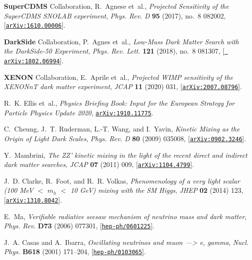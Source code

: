 \documentclass[prd,nofootinbib,preprint,superscriptaddress]{revtex4}
\begin{document}
\begin{thebibliography}{100}
{\bf SuperCDMS} Collaboration, R.~Agnese et~al., {\it {Projected Sensitivity of
  the SuperCDMS SNOLAB experiment}},  {\em Phys. Rev. D} {\bf 95} (2017), no.~8
  082002, [\href{http://arxiv.org/abs/1610.00006}{{\tt arXiv:1610.00006}}].

{\bf DarkSide} Collaboration, P.~Agnes et~al., {\it {Low-Mass Dark Matter
  Search with the DarkSide-50 Experiment}},  {\em Phys. Rev. Lett.} {\bf 121}
  (2018), no.~8 081307, [\href{http://arxiv.org/abs/1802.06994}{{\tt
  arXiv:1802.06994}}].

{\bf XENON} Collaboration, E.~Aprile et~al., {\it {Projected WIMP sensitivity
  of the XENONnT dark matter experiment}},  {\em JCAP} {\bf 11} (2020) 031,
  [\href{http://arxiv.org/abs/2007.08796}{{\tt arXiv:2007.08796}}].

R.~K. Ellis et~al., {\it {Physics Briefing Book}: {Input for the European
  Strategy for Particle Physics Update 2020}},
  \href{http://arxiv.org/abs/1910.11775}{{\tt arXiv:1910.11775}}.

C.~Cheung, J.~T. Ruderman, L.-T. Wang, and I.~Yavin, {\it {Kinetic Mixing as
  the Origin of Light Dark Scales}},  {\em Phys. Rev. D} {\bf 80} (2009)
  035008, [\href{http://arxiv.org/abs/0902.3246}{{\tt arXiv:0902.3246}}].

Y.~Mambrini, {\it {The ZZ' kinetic mixing in the light of the recent direct and
  indirect dark matter searches}},  {\em JCAP} {\bf 07} (2011) 009,
  [\href{http://arxiv.org/abs/1104.4799}{{\tt arXiv:1104.4799}}].

J.~D. Clarke, R.~Foot, and R.~R. Volkas, {\it {Phenomenology of a very light
  scalar (100 MeV \ensuremath{<} $m_h$ \ensuremath{<} 10 GeV) mixing with the
  SM Higgs}},  {\em JHEP} {\bf 02} (2014) 123,
  [\href{http://arxiv.org/abs/1310.8042}{{\tt arXiv:1310.8042}}].

E.~Ma, {\it {Verifiable radiative seesaw mechanism of neutrino mass and dark
  matter}},  {\em Phys. Rev.} {\bf D73} (2006) 077301,
  [\href{http://arxiv.org/abs/hep-ph/0601225}{{\tt hep-ph/0601225}}].

J.~A. Casas and A.~Ibarra, {\it {Oscillating neutrinos and muon ---> e,
  gamma}},  {\em Nucl. Phys.} {\bf B618} (2001) 171--204,
  [\href{http://arxiv.org/abs/hep-ph/0103065}{{\tt hep-ph/0103065}}].


\end{thebibliography}
\end{document}
